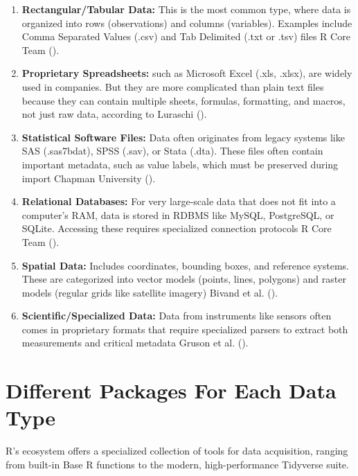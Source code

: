 \documentclass[
  doc,
  longtable,
  a4paper,
  nolmodern,
  notxfonts,
  notimes,
  colorlinks=true,linkcolor=blue,citecolor=blue,urlcolor=blue]{apa7}
\begin{document}
\begin{enumerate}
\def\labelenumi{\arabic{enumi}.}
\item
  \textbf{Rectangular/Tabular Data:} This is the most common type, where
  data is organized into rows (observations) and columns (variables).
  Examples include Comma Separated Values (.csv) and Tab Delimited (.txt
  or .tsv) files R Core Team ().
\item
  \textbf{Proprietary Spreadsheets:} such as Microsoft Excel (.xls,
  .xlsx), are widely used in companies. But they are more complicated
  than plain text files because they can contain multiple sheets,
  formulas, formatting, and macros, not just raw data, according to
  Luraschi ().
\item
  \textbf{Statistical Software Files:} Data often originates from legacy
  systems like SAS (.sas7bdat), SPSS (.sav), or Stata (.dta). These
  files often contain important metadata, such as value labels, which
  must be preserved during import Chapman University
  ().
\item
  \textbf{Relational Databases:} For very large-scale data that does not
  fit into a computer's RAM, data is stored in RDBMS like MySQL,
  PostgreSQL, or SQLite. Accessing these requires specialized connection
  protocols R Core Team ().
\item
  \textbf{Spatial Data:} Includes coordinates, bounding boxes, and
  reference systems. These are categorized into vector models (points,
  lines, polygons) and raster models (regular grids like satellite
  imagery) Bivand et al. ().
\item
  \textbf{Scientific/Specialized Data:} Data from instruments like
  sensors often comes in proprietary formats that require specialized
  parsers to extract both measurements and critical metadata Gruson et
  al. ().
\end{enumerate}

\section{Different Packages For Each Data
Type}\label{different-packages-for-each-data-type}

R's ecosystem offers a specialized collection of tools for data
acquisition, ranging from built-in Base R functions to the modern,
high-performance Tidyverse suite.
\end{document}
